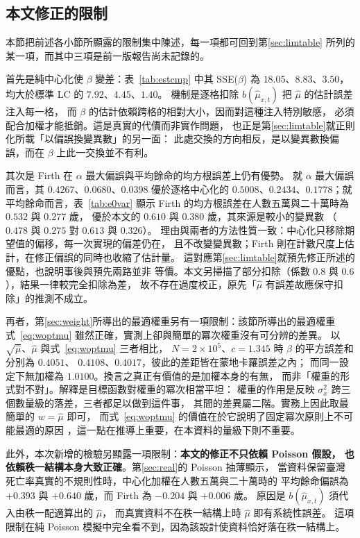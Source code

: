 \documentclass[UTF8, fontset=macnew, a4paper, 12pt]{ctexart}
\begin{document}
\subsection{本文修正的限制}\label{sec:lim}

本節把前述各小節所顯露的限制集中陳述，每一項都可回到第\ref{sec:limtable}
所列的某一項，而其中三項是前一版報告尚未記錄的。

首先是純中心化使 $\beta$ 變差：表~\ref{tab:estcmp} 中其 SSE($\beta$)
為 $18.05$、$8.83$、$3.50$，均大於標準 LC 的 $7.92$、$4.45$、$1.40$。
機制是逐格扣除 $b(\hat\mu_{x,t})$ 把 $\hat\mu$ 的估計誤差注入每一格，
而 $\beta$ 的估計依賴跨格的相對大小，因而對這種注入特別敏感，
必須配合加權才能抵銷。這是真實的代價而非實作問題，
也正是第\ref{sec:limtable}就正則化所載「以偏誤換變異數」的另一面：
此處交換的方向相反，是以變異數換偏誤，而在 $\beta$ 上此一交換並不有利。

其次是 Firth 在 $\alpha$ 最大偏誤與平均餘命的均方根誤差上仍有優勢。
就 $\alpha$ 最大偏誤而言，其 $0.4267$、$0.0680$、$0.0398$ 優於逐格中心化的
$0.5008$、$0.2434$、$0.1778$；就平均餘命而言，表~\ref{tab:e0var} 顯示
Firth 的均方根誤差在人數五萬與二十萬時為 $0.532$ 與 $0.277$ 歲，
優於本文的 $0.610$ 與 $0.380$ 歲，其來源是較小的變異數
（$0.478$ 與 $0.275$ 對 $0.613$ 與 $0.326$）。
理由與兩者的方法性質一致：中心化只移除期望值的偏移，每一次實現的偏差仍在，
且不改變變異數；Firth 則在計數尺度上估計，在修正偏誤的同時也收縮了估計量。
這對應第\ref{sec:limtable}就預先修正所述的優點，也說明事後與預先兩路並非
等價。本文另掃描了部分扣除（係數 $0.8$ 與 $0.6$），結果一律較完全扣除為差，
故不存在過度校正，原先「$\hat\mu$ 有誤差故應保守扣除」的推測不成立。

再者，第\ref{sec:weight}所導出的最適權重另有一項限制：該節所導出的最適權重
式~\eqref{eq:woptmu} 雖然正確，實測上卻與簡單的冪次權重沒有可分辨的差異。
以 $\sqrt{\hat\mu}$、$\hat\mu$ 與式~\eqref{eq:woptmu} 三者相比，
$N=2\times10^5$、$c=1.345$ 時 $\beta$ 的平方誤差和分別為 $0.4051$、
$0.4108$、$0.4017$，彼此的差距皆在蒙地卡羅誤差之內；
而同一設定下無加權為 $1.0100$。換言之真正有價值的是加權本身的有無，
而非「權重的形式對不對」。解釋是目標函數對權重的冪次相當平坦：
權重的作用是反映 $\sigma_x^2$ 跨三個數量級的落差，三者都足以做到這件事，
其間的差異屬二階。實務上因此取最簡單的 $w=\hat\mu$ 即可，
而式~\eqref{eq:woptmu} 的價值在於它說明了固定冪次原則上不可能最適的原因
，這一點在推導上重要，在本資料的量級下則不重要。

此外，本次新增的檢驗另顯露一項限制：\textbf{本文的修正不只依賴 Poisson 假設，
也依賴秩一結構本身大致正確}。第\ref{sec:real}的 Poisson 抽薄顯示，
當資料保留臺灣死亡率真實的不規則性時，中心化加權在人數五萬與二十萬時的
平均餘命偏誤為 $+0.393$ 與 $+0.640$ 歲，而 Firth 為 $-0.204$ 與 $+0.006$ 歲。
原因是 $b(\hat\mu_{x,t})$ 須代入由秩一配適算出的 $\hat\mu$，
而真實資料不在秩一結構上時 $\hat\mu$ 即有系統性誤差。
這項限制在純 Poisson 模擬中完全看不到，因為該設計使資料恰好落在秩一結構上。
\end{document}
